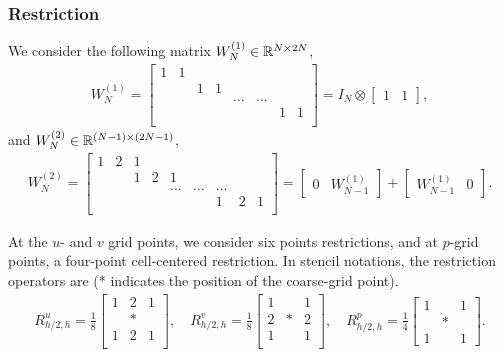 \documentclass[english]{pkupaper}
\newenvironment{eqt}{\begin{equation}\begin{aligned}}{\end{aligned}\end{equation}}
\begin{document}
\subsubsection{Restriction}
We consider the following matrix $W^{(1)}_N\in\mathbb{R}^{N\times 2N}$,
\begin{eqt}
W^{(1)}_N=\begin{bmatrix}
1&1\\
&&1&1\\
&&&&\dots&\dots\\
&&&&&&1&1\\
\end{bmatrix}=I_N\otimes \begin{bmatrix}1&1\end{bmatrix},
\end{eqt} and $W^{(2)}_N\in\mathbb{R}^{(N-1)\times (2N-1)}$,
\begin{eqt}
W_N^{(2)}=
\begin{bmatrix}
1&2&1\\
&&1&2&1\\
&&&&\dots&\dots&\dots\\
&&&&&&1&2&1\\
\end{bmatrix}=\begin{bmatrix}0&W_{N-1}^{(1)}\end{bmatrix}+\begin{bmatrix}W_{N-1}^{(1)}&0\end{bmatrix}.
\end{eqt}

At the $u$- and $v$ grid points, we consider six points restrictions, and at $p$-grid points, a four-point cell-centered restriction. In stencil notations, the restriction operators are (* indicates the position of the coarse-grid point). 
\begin{eqt}
\label{rh2h}
R_{h/2,h}^u=\frac{1}{8}\begin{bmatrix}1&2&1\\
&*\\
1&2&1\\\end{bmatrix}, \quad R_{h/2,h}^v=\frac{1}{8}\begin{bmatrix}
1&&1\\
2&*&2\\
1&&1\\\end{bmatrix}, \quad R_{h/2,h}^p=\frac{1}{4}\begin{bmatrix}
1&&1\\
&*&\\
1&&1
\end{bmatrix}.
\end{eqt}
\end{document}
